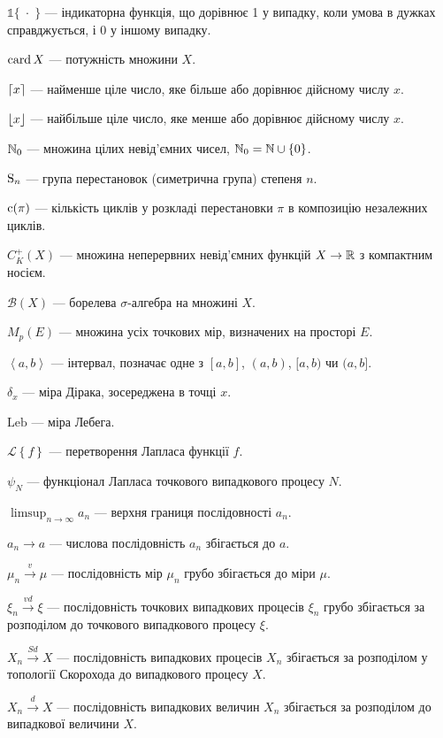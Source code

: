 $\mathds{1}\{\; \cdot\;\}$ --- індикаторна функція, що дорівнює 1 у випадку, коли умова в
дужках справджується, і 0 у іншому випадку.

$\card X$ --- потужність множини $X$. 

$\ceil*{x}$ --- найменше ціле число, яке більше або дорівнює дійсному числу $x$.%

$\floor*{x}$ --- найбільше ціле число, яке менше або дорівнює дійсному числу $x$.%

$\N_0$ --- множина цілих невід'ємних чисел, $\N_0 = \N \cup \{0\}$.

$\Sym{n}$ --- група перестановок (симетрична група) степеня $n$.

$\cycle({\pi})$ --- кількість циклів у розкладі перестановки $\pi$ в композицію
незалежних циклів.

$C_K^+(X)$ --- множина неперервних невід'ємних функцій
$X \to \R$ з компактним носієм.

$\mathcal{B}(X)$ --- борелева $\sigma$-алгебра на множині $X$.

$M_p(E)$ --- множина усіх точкових мір, визначених на просторі $E$.

$\left<a,b\right>$ --- інтервал, позначає одне з $[a, b]$, $(a, b)$, $[a, b)$ чи $(a, b]$.

$\delta_x$ --- міра Дірака, зосереджена в точці $x$.

$\mathrm{Leb}$ --- міра Лебега.

$\mathcal{L}\left\{f\right\}$ --- перетворення Лапласа функції $f$.

$\psi_N$ --- функціонал Лапласа точкового випадкового процесу $N$.

$\limsup_{n\to\infty} a_n$ --- верхня границя послідовності $a_n$.

$a_n \to a$ --- числова послідовність $a_n$ збігається до $a$.

$\mu_n \overset{v}{\longrightarrow} \mu$ --- послідовність мір $\mu_n$
грубо збігається до міри $\mu$.

$\xi_n \overset{vd}{\longrightarrow} \xi$ --- послідовність точкових випадкових процесів $\xi_n$
грубо збігається за розподілом до точкового випадкового процесу $\xi$.

$X_n \overset{Sd}{\longrightarrow} X$ --- послідовність випадкових процесів $X_n$
збігається за розподілом у топології Скорохода до випадкового процесу $X$.

$X_n \overset{d}{\longrightarrow} X$ --- послідовність випадкових величин $X_n$
збігається за розподілом до випадкової величини $X$.

